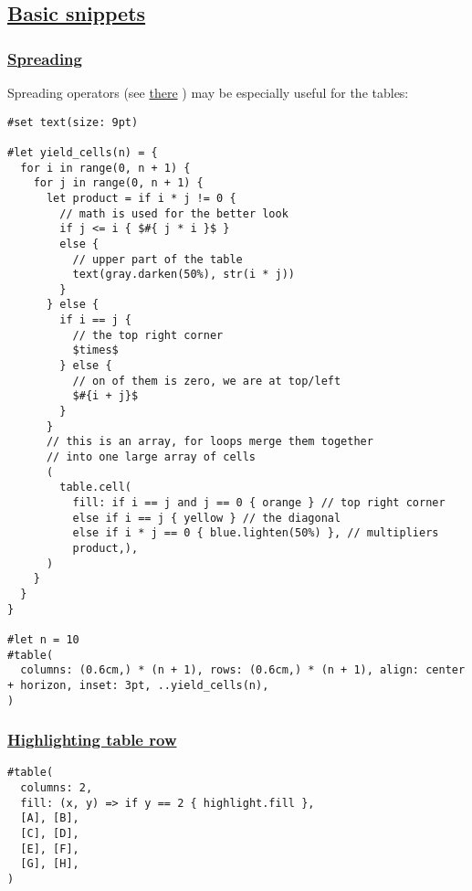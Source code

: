 \subsection{\texorpdfstring{\hyperref[basic-snippets]{Basic
snippets}}{Basic snippets}}\label{basic-snippets}

\subsubsection{\texorpdfstring{\hyperref[spreading]{Spreading}}{Spreading}}\label{spreading}

Spreading operators (see \href{../scripting/arguments.html}{there} ) may
be especially useful for the tables:

\begin{verbatim}
#set text(size: 9pt)

#let yield_cells(n) = {
  for i in range(0, n + 1) {
    for j in range(0, n + 1) {
      let product = if i * j != 0 {
        // math is used for the better look 
        if j <= i { $#{ j * i }$ } 
        else {
          // upper part of the table
          text(gray.darken(50%), str(i * j))
        }
      } else {
        if i == j {
          // the top right corner 
          $times$
        } else {
          // on of them is zero, we are at top/left
          $#{i + j}$
        }
      }
      // this is an array, for loops merge them together
      // into one large array of cells
      (
        table.cell(
          fill: if i == j and j == 0 { orange } // top right corner
          else if i == j { yellow } // the diagonal
          else if i * j == 0 { blue.lighten(50%) }, // multipliers
          product,),
      )
    }
  }
}

#let n = 10
#table(
  columns: (0.6cm,) * (n + 1), rows: (0.6cm,) * (n + 1), align: center + horizon, inset: 3pt, ..yield_cells(n),
)
\end{verbatim}

\pandocbounded{}

\subsubsection{\texorpdfstring{\hyperref[highlighting-table-row]{Highlighting
table row}}{Highlighting table row}}\label{highlighting-table-row}

\begin{verbatim}
#table(
  columns: 2,
  fill: (x, y) => if y == 2 { highlight.fill },
  [A], [B],
  [C], [D],
  [E], [F],
  [G], [H],
)
\end{verbatim}

